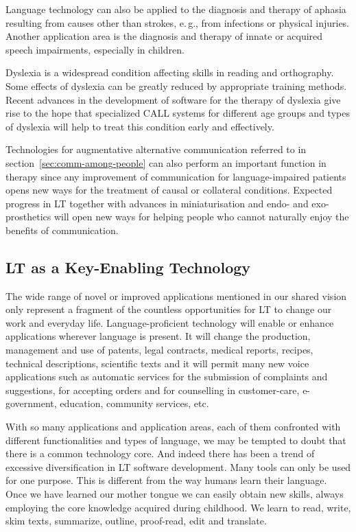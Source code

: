 \documentclass[10pt, plain]{../../metanetpaper}
\begin{document}
\begin{multicols}{2}
Language technology can also be applied to the diagnosis and therapy of aphasia resulting from causes other than strokes, e.\,g., from infections or physical injuries. Another application area is the diagnosis and therapy of innate or acquired speech impairments, especially in children. 
 
Dyslexia is a widespread condition affecting skills in reading and orthography. Some effects of dyslexia can be greatly reduced by appropriate training methods. Recent advances in the development of software for the therapy of dyslexia give rise to the hope that specialized CALL systems for different age groups and types of dyslexia will help to treat this condition early and effectively.
 
Technologies for augmentative alternative communication referred to in section~\ref{sec:comm-among-people} can also perform an important function in therapy since any improvement of communication for language-impaired patients opens new ways for the treatment of causal or collateral conditions. Expected progress in LT together with advances in miniaturisation and endo- and exo-prosthetics will open new ways for helping people who cannot naturally enjoy the benefits of communication.

\subsection[Language Technology as a Key-Enabling Technology]{LT as a Key-Enabling Technology}
\label{sec:lang-techn-as-key-enabling-technology}

The wide range of novel or improved applications mentioned in our shared vision only represent a fragment of the countless opportunities for LT to change our work and everyday life. Language-proficient technology will enable or enhance applications wherever language is present. It will change the production, management and use of patents, legal contracts, medical reports, recipes, technical descriptions, scientific texts and it will permit many new voice applications such as automatic services for the submission of complaints and suggestions, for accepting orders and for counselling in customer-care, e-government, education, community services, etc.   

With so many applications and application areas, each of them confronted with different functionalities and types of language, we may be tempted to doubt that there is a common technology core. And indeed there has been a trend of excessive diversification in LT software development. Many tools can only be used for one purpose. This is different from the way humans learn their language. Once we have learned our mother tongue we can easily obtain new skills, always employing the core knowledge acquired during childhood. We learn to read, write, skim texts, summarize, outline, proof-read, edit and translate.
 

\end{multicols}
\end{document}
